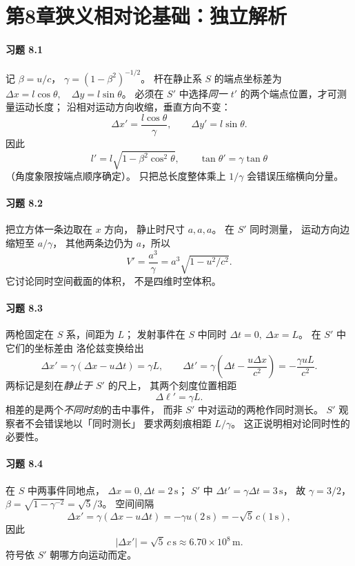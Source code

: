 \section*{第8章\quad 狭义相对论基础：独立解析}

\paragraph{习题 8.1}
记 \(\beta=u/c\)，
\(\gamma=(1-\beta^2)^{-1/2}\)。
杆在静止系 \(S\) 的端点坐标差为
\(\Delta x=l\cos\theta,\quad\Delta y=l\sin\theta\)。
必须在 \(S'\) 中选择\emph{同一 \(t'\)}
的两个端点位置，才可测量运动长度；
沿相对运动方向收缩，垂直方向不变：
\[
 \Delta x'=\frac{l\cos\theta}{\gamma},\qquad
 \Delta y'=l\sin\theta.
\]
因此
\[
 \boxed{l'=l\sqrt{1-\beta^2\cos^2\theta}},\qquad
 \boxed{\tan\theta'=\gamma\tan\theta}
\]
（角度象限按端点顺序确定）。
只把总长度整体乘上 \(1/\gamma\)
会错误压缩横向分量。

\paragraph{习题 8.2}
把立方体一条边取在 \(x\) 方向，
静止时尺寸 \(a,a,a\)。
在 \(S'\) 同时测量，
运动方向边缩短至 \(a/\gamma\)，
其他两条边仍为 \(a\)，所以
\[
 \boxed{V'=\frac{a^3}{\gamma}
 =a^3\sqrt{1-u^2/c^2}}.
\]
它讨论同时空间截面的体积，
不是四维时空体积。

\paragraph{习题 8.3}
两枪固定在 \(S\) 系，间距为 \(L\)；
发射事件在 \(S\) 中同时
\(\Delta t=0,\ \Delta x=L\)。
在 \(S'\) 中它们的坐标差由
洛伦兹变换给出
\[
 \Delta x'=\gamma(\Delta x-u\Delta t)=\gamma L,\qquad
 \Delta t'=\gamma\left(\Delta t-
 \frac{u\Delta x}{c^2}\right)
 =-\frac{\gamma uL}{c^2}.
\]
两标记是刻在\emph{静止于 \(S'\)} 的尺上，
其两个刻度位置相距
\[
 \boxed{\Delta \ell'=\gamma L}.
\]
相差的是两个\emph{不同时刻}的击中事件，
而非 \(S'\) 中对运动的两枪作同时测长。
\(S'\) 观察者不会错误地以「同时测长」
要求两刻痕相距 \(L/\gamma\)。
这正说明相对论同时性的必要性。

\paragraph{习题 8.4}
在 \(S\) 中两事件同地点，
\(\Delta x=0,\Delta t=2\,\mathrm s\)；
\(S'\) 中
\(\Delta t'=\gamma\Delta t=3\,\mathrm s\)，
故 \(\gamma=3/2\)，
\(\beta=\sqrt{1-\gamma^{-2}}=\sqrt5/3\)。
空间间隔
\[
 \Delta x'=\gamma(\Delta x-u\Delta t)
 =-\gamma u(2\,\mathrm s)
 =-\sqrt5\,c(1\,\mathrm s),
\]
因此
\[
 \boxed{|\Delta x'|=\sqrt5\,c\,\mathrm s
 \approx6.70\times10^8\,\mathrm m}.
\]
符号依 \(S'\) 朝哪方向运动而定。

